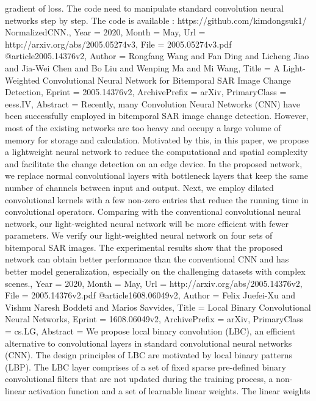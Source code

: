 {{{{{gradient of loss. The code need to manipulate standard convolution neural
networks step by step. The code is available : https://github.com/kimdongsuk1/
NormalizedCNN.},
Year          = {2020},
Month         = {May},
Url           = {http://arxiv.org/abs/2005.05274v3},
File          = {2005.05274v3.pdf}
}
@article{2005.14376v2,
Author        = {Rongfang Wang and Fan Ding and Licheng Jiao and Jia-Wei Chen and Bo Liu and Wenping Ma and Mi Wang},
Title         = {A Light-Weighted Convolutional Neural Network for Bitemporal SAR Image
  Change Detection},
Eprint        = {2005.14376v2},
ArchivePrefix = {arXiv},
PrimaryClass  = {eess.IV},
Abstract      = {Recently, many Convolution Neural Networks (CNN) have been successfully
employed in bitemporal SAR image change detection. However, most of the
existing networks are too heavy and occupy a large volume of memory for storage
and calculation. Motivated by this, in this paper, we propose a lightweight
neural network to reduce the computational and spatial complexity and
facilitate the change detection on an edge device. In the proposed network, we
replace normal convolutional layers with bottleneck layers that keep the same
number of channels between input and output. Next, we employ dilated
convolutional kernels with a few non-zero entries that reduce the running time
in convolutional operators. Comparing with the conventional convolutional
neural network, our light-weighted neural network will be more efficient with
fewer parameters. We verify our light-weighted neural network on four sets of
bitemporal SAR images. The experimental results show that the proposed network
can obtain better performance than the conventional CNN and has better model
generalization, especially on the challenging datasets with complex scenes.},
Year          = {2020},
Month         = {May},
Url           = {http://arxiv.org/abs/2005.14376v2},
File          = {2005.14376v2.pdf}
}
@article{1608.06049v2,
Author        = {Felix Juefei-Xu and Vishnu Naresh Boddeti and Marios Savvides},
Title         = {Local Binary Convolutional Neural Networks},
Eprint        = {1608.06049v2},
ArchivePrefix = {arXiv},
PrimaryClass  = {cs.LG},
Abstract      = {We propose local binary convolution (LBC), an efficient alternative to
convolutional layers in standard convolutional neural networks (CNN). The
design principles of LBC are motivated by local binary patterns (LBP). The LBC
layer comprises of a set of fixed sparse pre-defined binary convolutional
filters that are not updated during the training process, a non-linear
activation function and a set of learnable linear weights. The linear weights
}}}}}

